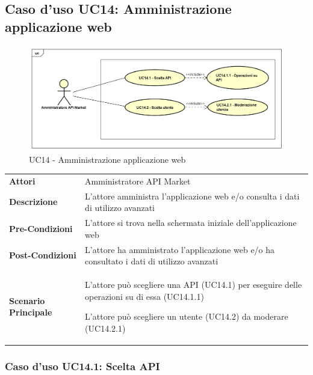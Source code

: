\newpage
\subsection{Caso d'uso UC14: Amministrazione applicazione web}
\label{UC14}
\begin{figure}[ht]
	\centering
	\includegraphics[scale=0.45]{UML/UC14.png}
	\caption{UC14 - Amministrazione applicazione web}
\end{figure}

\begin{longtable}{ l | p{11cm}}
	\hline
	\rowcolor{Gray}
	\multicolumn{2}{c}{UC14: Amministrazione applicazione web} \\
	\hline
	\textbf{Attori} & Amministratore API Market \\
	\textbf{Descrizione} & L'attore amministra l'applicazione web e/o consulta i dati di utilizzo avanzati \\
	\textbf{Pre-Condizioni} & L'attore si trova nella schermata iniziale dell'applicazione web \\
	\textbf{Post-Condizioni} & L'attore ha amministrato l'applicazione web e/o ha consultato i dati di utilizzo avanzati \\
	\textbf{Scenario Principale} & 
	\begin{enumerate*}[label=(\arabic*.),itemjoin={\newline}]
		\item L'attore può scegliere una API (UC14.1) per eseguire delle operazioni su di essa (UC14.1.1)
		\item L'attore può scegliere un utente (UC14.2) da moderare (UC14.2.1)
	\end{enumerate*}\\
\end{longtable}

\subsubsection{Caso d'uso UC14.1: Scelta API}
\label{UC14_1}

